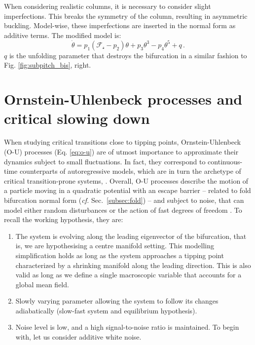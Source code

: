 When considering realistic columns, it is necessary to consider slight imperfections. This breaks the symmetry of the column, resulting in asymmetric buckling. Model-wise, these imperfections are inserted in the normal form as additive terms. The modified model is:
\begin{equation}
	\dot{\theta} = p_1(\mathcal{F_s}-p_2)\theta + p_3\theta^3 - p_4\theta^5 + q \, .
\end{equation}
$q$ is the unfolding parameter that destroys the bifurcation in a similar fashion to Fig. \ref{fig:subpitch_bis}, right. \\





\tocless\section{Ornstein-Uhlenbeck processes and critical slowing down}
\label{sec:o-u}

When studying critical transitions close to tipping points, Ornstein-Uhlenbeck (\gls{O-U}) processes (Eq. \ref{eq:o-u}) are of utmost importance to approximate their dynamics subject to small fluctuations. In fact, they correspond to continuous-time counterparts of autoregressive models, which are in turn the archetype of critical transition-prone systems, \textcite{Scheffer2009}. Overall, \gls{O-U} processes describe the motion of a particle moving in a quadratic potential with an escape barrier -- related to fold bifurcation normal form (\textit{cf.} Sec.~\ref{subsec:fold}) -- and subject to noise, that can model either random disturbances or  the action of fast degrees of freedom \citep{Berglund2006}. To recall the working hypothesis, they are:

\begin{enumerate}
	\item The system is evolving along the leading eigenvector of the bifurcation, that is, we are hypothesising a centre manifold setting. This modelling simplification holds as long as the system approaches a tipping point characterized by a shrinking manifold along the leading direction. This is also valid as long as we define a single macroscopic variable that accounts for a global mean field.
	\item Slowly varying parameter allowing the system to follow its changes adiabatically (slow-fast system and equilibrium hypothesis).
	\item Noise level is low, and a high signal-to-noise ratio is maintained. To begin with, let us consider additive white noise.
\end{enumerate}

